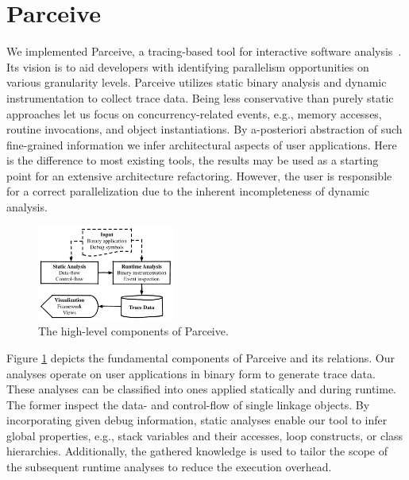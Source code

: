\section{Parceive}
\label{sec:parceive}
We implemented Parceive, a tracing-based tool for interactive software
analysis~\cite{Parceive}. Its vision is to aid developers with identifying
parallelism opportunities on various granularity levels. Parceive utilizes
static binary analysis and dynamic instrumentation to collect trace data. Being
less conservative than purely static approaches let us focus on
concurrency-related events, e.g., memory accesses, routine invocations, and
object instantiations. By a-posteriori abstraction of such fine-grained
information we infer architectural aspects of user applications. Here is the
difference to most existing tools, the results may be used as a starting point
for an extensive architecture refactoring. However, the user is responsible for
a correct parallelization due to the inherent incompleteness of dynamic
analysis.

\begin{figure}[h!]
	\begin{center}
		\includegraphics[width=0.40\textwidth]{img/parceive}
		\caption{The high-level components of Parceive.}
		\label{fig:parceive_overview}
	\end{center}
\end{figure}

Figure \ref{fig:parceive_overview} depicts the fundamental components of
Parceive and its relations. Our analyses operate on user applications in
binary form to generate trace data. These analyses can be classified into ones
applied statically and during runtime. The former inspect the data- and
control-flow of single linkage objects. By incorporating given debug
information, static analyses enable our tool to infer global properties, e.g.,
stack variables and their accesses, loop constructs, or class hierarchies.
Additionally, the gathered knowledge is used to tailor the scope of the
subsequent runtime analyses to reduce the execution overhead.

